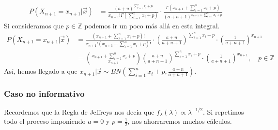 \begin{align*}
     P(X_{n+1} = x_{n+1} | \vec{x}) &= \frac{(a+n)^{\sum_{i=1}^{n} x_i + p}}{x_{n+1}!\Gamma(\sum_{i=1}^{n} x_i + p)} \cdot \frac{\Gamma\left( x_{n+1} + \sum_{i=1}^{n} x_i + p\right)}{(a+n+1)^{x_{n+1} + \sum_{i=1}^{n} x_i + p}}
\end{align*}
Si consideramos que $p \in \mathbb{Z}$ podemos ir un poco más allá en esta integral.
\begin{align*}
    P(X_{n+1} = x_{n+1} | \vec{x}) &= \frac{\left( x_{n+1} + \sum_{i=1}^{n} x_i + p\right)!}{x_{n+1}!\left( x_{n+1} + \sum_{i=1}^{n} x_i + p \right)!} \cdot \left( \frac{a+n}{a+n+1}\right)^{\sum_{i=1}^{n} x_i + p} \cdot \left( \frac{1}{a+n+1}\right)^{x_{n+1}} \\
    &= \binom{x_{n+1} + \sum_{i=1}^{n} x_i + p}{x_{n+1}}\left( \frac{a+n}{a+n+1}\right)^{\sum_{i=1}^{n} x_i + p} \cdot \left( \frac{1}{a+n+1}\right)^{x_{n+1}}, \quad p \in \mathbb{Z}
\end{align*}
Así, hemos llegado a que $x_{n+1} | \vec{x} \sim BN\left( \sum_{i=1}^{n} x_i + p, \frac{a+n}{a+n+1} \right)$.
\subsubsection{Caso no informativo}
\noindent Recordemos que la Regla de Jeffreys nos decía que $f_{\lambda}(\lambda) \propto \lambda^{-1/2}$. Si repetimos todo el proceso imponiendo $a =0$ y $ p = \frac{1}{2}$, nos ahorraremos muchos cálculos.

